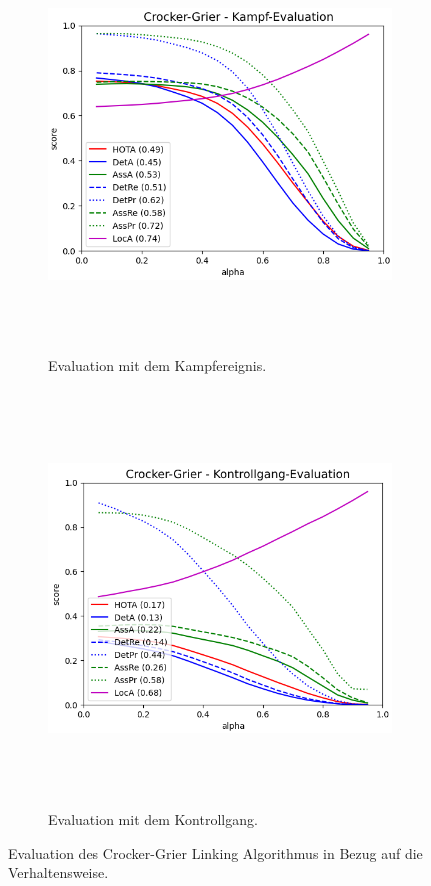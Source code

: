 \begin{figure}[htbp]
     \centering
     \begin{subfigure}[b]{0.9\textwidth}
         \centering
         \includegraphics[width=\textwidth, height=11cm]{img/Plots/MOT Evaluation/HOTA CrockGrier Kampf.png}
         \caption{Evaluation mit dem Kampfereignis.}
     \end{subfigure}
     \hfill
     \begin{subfigure}[b]{0.9\textwidth}
         \centering
         \includegraphics[width=\textwidth, height=11cm]{img/Plots/MOT Evaluation/HOTA CrockGrier Kontrollgang.png}
         \caption{Evaluation mit dem Kontrollgang.}
     \end{subfigure}
     \caption{Evaluation des Crocker-Grier Linking Algorithmus in Bezug auf die Verhaltensweise.}
     \label{fig:CROCKHOTAEreig}
\end{figure}

